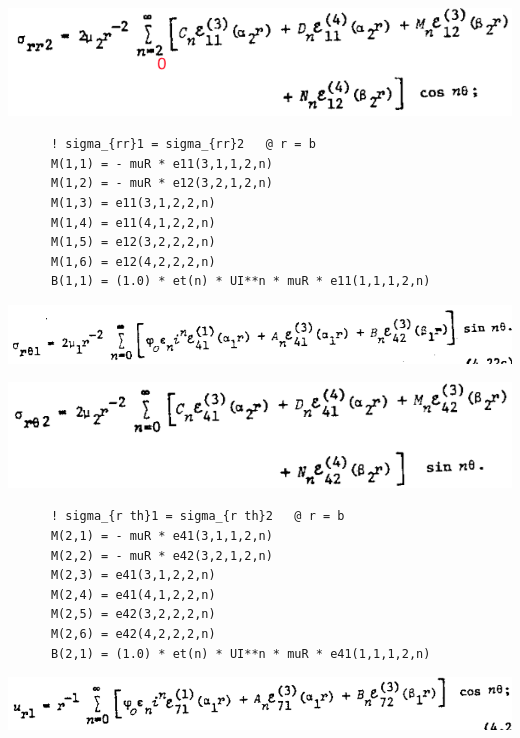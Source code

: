 \documentclass [11pt,spanish]{article}
\begin{document}
\includegraphics[scale=0.5]{srr2}
\begingroup
\fontsize{10pt}{12pt}
\selectfont
{}
\begin{shaded}
\begin{verbatim}
      ! sigma_{rr}1 = sigma_{rr}2   @ r = b
      M(1,1) = - muR * e11(3,1,1,2,n)
      M(1,2) = - muR * e12(3,2,1,2,n)
      M(1,3) = e11(3,1,2,2,n)
      M(1,4) = e11(4,1,2,2,n)
      M(1,5) = e12(3,2,2,2,n)
      M(1,6) = e12(4,2,2,2,n) 
      B(1,1) = (1.0) * et(n) * UI**n * muR * e11(1,1,1,2,n)
\end{verbatim}
\end{shaded}
\endgroup
\includegraphics[scale=0.5]{srt1}

\includegraphics[scale=0.5]{srt2}
\begingroup
\fontsize{10pt}{12pt}
\selectfont
{}
\begin{shaded}
\begin{verbatim}
      ! sigma_{r th}1 = sigma_{r th}2   @ r = b
      M(2,1) = - muR * e41(3,1,1,2,n)
      M(2,2) = - muR * e42(3,2,1,2,n)
      M(2,3) = e41(3,1,2,2,n)
      M(2,4) = e41(4,1,2,2,n)
      M(2,5) = e42(3,2,2,2,n)
      M(2,6) = e42(4,2,2,2,n)
      B(2,1) = (1.0) * et(n) * UI**n * muR * e41(1,1,1,2,n)

\end{verbatim}
\end{shaded}
\endgroup
\includegraphics[scale=0.5]{ur1}
\end{document}
